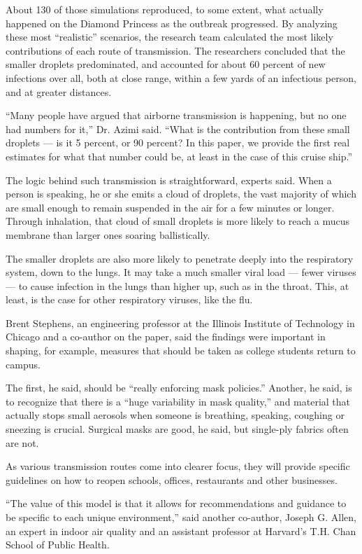 About 130 of those simulations reproduced, to some extent, what actually
happened on the Diamond Princess as the outbreak progressed. By
analyzing these most ``realistic'' scenarios, the research team
calculated the most likely contributions of each route of transmission.
The researchers concluded that the smaller droplets predominated, and
accounted for about 60 percent of new infections over all, both at close
range, within a few yards of an infectious person, and at greater
distances.

``Many people have argued that airborne transmission is happening, but
no one had numbers for it,'' Dr. Azimi said. ``What is the contribution
from these small droplets --- is it 5 percent, or 90 percent? In this
paper, we provide the first real estimates for what that number could
be, at least in the case of this cruise ship.''

The logic behind such transmission is straightforward, experts said.
When a person is speaking, he or she emits a cloud of droplets, the vast
majority of which are small enough to remain suspended in the air for a
few minutes or longer. Through inhalation, that cloud of small droplets
is more likely to reach a mucus membrane than larger ones soaring
ballistically.

The smaller droplets are also more likely to penetrate deeply into the
respiratory system, down to the lungs. It may take a much smaller viral
load --- fewer viruses --- to cause infection in the lungs than higher
up, such as in the throat. This, at least, is the case for other
respiratory viruses, like the flu.

Brent Stephens, an engineering professor at the Illinois Institute of
Technology in Chicago and a co-author on the paper, said the findings
were important in shaping, for example, measures that should be taken as
college students return to campus.

The first, he said, should be ``really enforcing mask policies.''
Another, he said, is to recognize that there is a ``huge variability in
mask quality,'' and material that actually stops small aerosols when
someone is breathing, speaking, coughing or sneezing is crucial.
Surgical masks are good, he said, but single-ply fabrics often are not.

As various transmission routes come into clearer focus, they will
provide specific guidelines on how to reopen schools, offices,
restaurants and other businesses.

``The value of this model is that it allows for recommendations and
guidance to be specific to each unique environment,'' said another
co-author, Joseph G. Allen, an expert in indoor air quality and an
assistant professor at Harvard's T.H. Chan School of Public Health.

